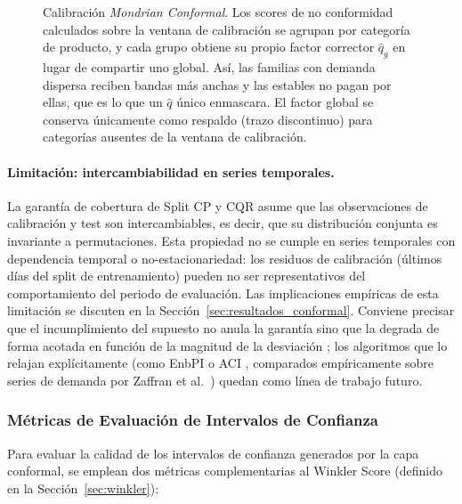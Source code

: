 \begin{figure}[H]
\shorthandon{>}%
\caption[Calibración Mondrian Conformal por categoría]{Calibración \textit{Mondrian Conformal}. Los scores de no conformidad calculados sobre la
ventana de calibración se agrupan por categoría de producto, y cada grupo obtiene su propio factor
corrector $\hat{q}_g$ en lugar de compartir uno global. Así, las familias con demanda dispersa reciben
bandas más anchas y las estables no pagan por ellas, que es lo que un $\hat{q}$ único enmascara. El
factor global se conserva únicamente como respaldo (trazo discontinuo) para categorías ausentes de la
ventana de calibración.}
\label{fig:mondrian_conformal}
\end{figure}

\paragraph{Limitación: intercambiabilidad en series temporales.}
La garantía de cobertura de Split CP y CQR asume que las observaciones de calibración y test son
intercambiables, es decir, que su distribución conjunta es invariante a permutaciones. Esta
propiedad no se cumple en series temporales con dependencia temporal o no-estacionariedad: los
residuos de calibración (últimos días del split de entrenamiento) pueden no ser representativos
del comportamiento del periodo de evaluación. Las implicaciones empíricas de esta limitación
se discuten en la Sección~\ref{sec:resultados_conformal}. Conviene precisar que el incumplimiento
del supuesto no anula la garantía sino que la degrada de forma acotada en función de la magnitud de
la desviación \cite{barber2023beyond}; los algoritmos que lo relajan explícitamente
(como EnbPI \cite{xu2021conformal} o ACI \cite{gibbs2021adaptive}, comparados empíricamente sobre
series de demanda por Zaffran et al.\ \cite{zaffran2022adaptive}) quedan como línea de trabajo futuro.

\subsubsection{Métricas de Evaluación de Intervalos de Confianza}
Para evaluar la calidad de los intervalos de confianza generados por la capa conformal,
se emplean dos métricas complementarias al Winkler Score (definido en la Sección~\ref{sec:winkler}):

